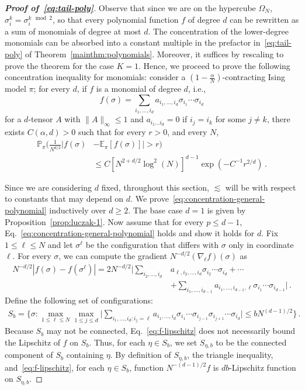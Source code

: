 \documentclass[reqno,11pt]{amsart}
\numberwithin{equation}{section}
\theoremstyle{definition}{
\newtheorem{example}[theorem]{Example}
\newtheorem{definition}[theorem]{Definition}
\newtheorem*{definition*}{Definition}
\newtheorem{problem}[theorem]{Problem}
\newtheorem{question}[theorem]{Question}
\newtheorem{remark}[theorem]{Remark}
}
\begin{document}
\begin{proof}[\textbf{\emph{Proof of~\eqref{eq:tail-poly}}}]
Observe that since we are on the hypercube $\Omega_N$, $\sigma_i^k = \sigma_i^{k \mod 2}$, so that every polynomial function $f$ of degree $d$ can be rewritten as a sum of monomials of degree at most $d$. 
The concentration of the lower-degree monomials can be absorbed into a constant multiple in the prefactor in~\eqref{eq:tail-poly} of Theorem~\ref{mainthm:polynomials}. Moreover, it suffices by rescaling to prove the theorem for the case $K=1$. 
Hence, we proceed to prove the following concentration inequality for monomials: consider a $(1-\frac {\alpha}N)$-contracting Ising model $\pi$; for every $d$, if $f$ is a monomial of degree $d$, i.e.,
\[
f(\sigma)=\sum_{i_1,...,i_d} a_{i_1,...,i_d}\sigma_{i_1}\cdots \sigma_{i_d}
\]   
for a $d$-tensor $A$ with $\|A\|_\infty \leq 1$ and  $a_{i_1... i_d} =0$ if $i_j=i_k$ for some $j\neq k$, there exists $C(\alpha,d)>0$ such that for every $r>0$, and every $N$,
\begin{align}\label{eq:concentration-general-polynomial}
\mathbb P_\pi  \Big ( \frac {1}{N^{d/2}}  \big|f(\sigma) & -\mathbb E_\pi [f(\sigma)]\big|> r \Big) \nonumber \\ 
 & \leq C[N^{2+d/2} \log^2 ( N)]^{d-1} \exp\left(-C^{-1}{r^{2/d}}\right)\,.
\end{align}

Since we are considering $d$ fixed, throughout this section, $\lesssim$ will be with respect to constants that may depend on $d$.
We prove~\eqref{eq:concentration-general-polynomial} inductively over $d\geq 2$. The base case $d=1$ is given by Proposition~\ref{prop:luczak-1}. Now assume that for every $p\leq d-1$, Eq.~\eqref{eq:concentration-general-polynomial} holds and show it holds for $d$. Fix $1\leq \ell \leq N$ and let $\sigma^\ell$ be the configuration that differs with $\sigma$ only in coordinate $\ell$. For every $\sigma$, we can compute the gradient $N^{-d/2} (\nabla_{\ell} f)(\sigma)$ as
\begin{align}\label{eq:f-lipschitz}
N^{-d/2}|f(\sigma)-f(\sigma^\ell)| =  2N^{-d/2}  \bigg |\sum_{i_2,...,i_d}   & a_{\ell, i_2,...,i_d}  \sigma_{i_2} \cdots \sigma_{i_d} + \cdots  \nonumber \\ 
& + \sum _{i_1,...,i_{d-1}} a_{i_1,...,i_{d-1},\ell} \sigma_{i_1} \cdots \sigma_{i_{d-1}}\bigg|\,.
\end{align}
Define the following set of configurations: 
\begin{align}\label{eq:S_b}
S_b= \bigg\{ \sigma : \max_{1\leq \ell\leq N} \max_{1\leq j\leq d} \Big|\sum_{i_1,...,i_d: i_j=\ell} a_{i_1,...,i_d} \sigma_{i_1} \cdots \sigma_{i_{j-1}} \sigma_{i_{j+1}} \cdots \sigma_{i_d}\Big| \leq b N^{(d-1)/2}\bigg\}\,.
\end{align}
Because $S_b$ may not be connected, Eq.~\eqref{eq:f-lipschitz} does not necessarily bound the Lipschitz of $f$ on $S_b$. Thus, for each $\eta\in S_b$, we set $S_{\eta,b}$ to be the connected component of $S_b$ containing $\eta$. By definition of $S_{\eta,b}$, the triangle inequality, and~\eqref{eq:f-lipschitz}, for each $\eta \in S_b$, function $N^{-(d-1)/2}f$ is $db$-Lipschitz function on $S_{\eta,b}$. 


\end{proof}
\end{document}
